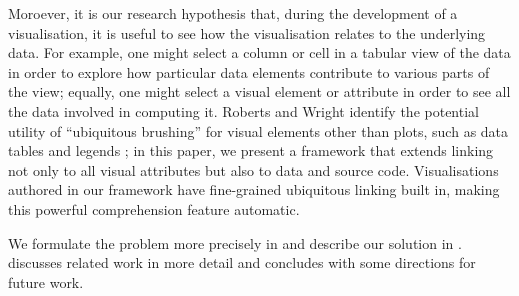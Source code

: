 Moroever, it is our research hypothesis that, during the development of a
visualisation, it is useful to see how the visualisation relates to the
underlying data. For example, one might select a column or cell in a tabular
view of the data in order to explore how particular data elements contribute to
various parts of the view; equally, one might select a visual element or
attribute in order to see all the data involved in computing it. Roberts and
Wright identify the potential utility of ``ubiquitous brushing'' for visual
elements other than plots, such as data tables and legends \cite{roberts06}; in
this paper, we present a framework that extends linking not only to all visual
attributes but also to data and source code. Visualisations authored in our
framework have fine-grained ubiquitous linking built in, making this powerful
comprehension feature automatic.

We formulate the problem more precisely in  and
describe our solution in .  discusses
related work in more detail and  concludes with some
directions for future work.
